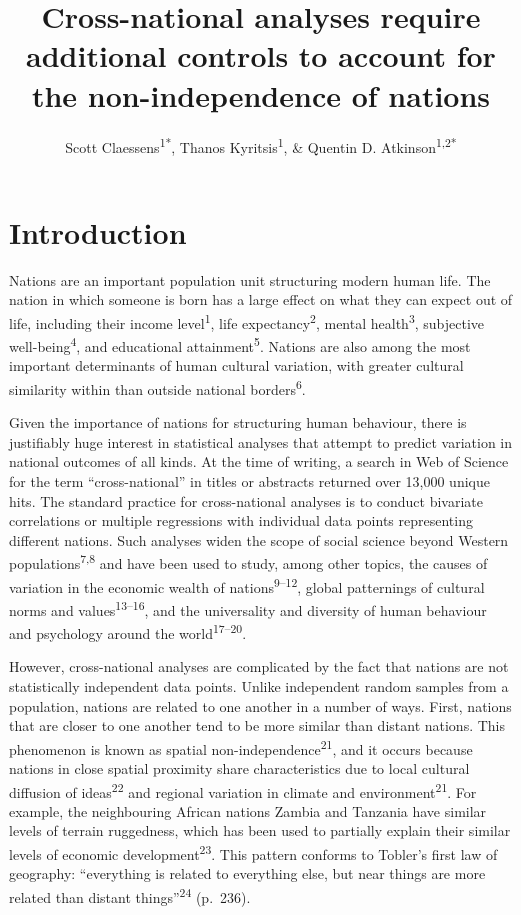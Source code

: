 \documentclass[
  man,floatsintext]{apa6}
\title{Cross-national analyses require additional controls to account for the non-independence of nations}
\author{Scott Claessens\textsuperscript{1*}, Thanos Kyritsis\textsuperscript{1}, \& Quentin D. Atkinson\textsuperscript{1,2*}}
\date{}
\affiliation{\vspace{0.5cm}\textsuperscript{1} \footnotesize School of Psychology, University of Auckland, Auckland, New Zealand\\\textsuperscript{2} \footnotesize School of Anthropology and Museum Ethnography, University of Oxford, Oxford, United Kingdom \newline *email: \href{mailto:scott.claessens@gmail.com}{\nolinkurl{scott.claessens@gmail.com}}; \href{mailto:q.atkinson@auckland.ac.nz}{\nolinkurl{q.atkinson@auckland.ac.nz}}}
\begin{document}
\maketitle

\linenumbers

\hypertarget{introduction}{%
\section{Introduction}\label{introduction}}

Nations are an important population unit structuring modern human life. The nation in which someone is born has a large effect on what they can expect out of life, including their income level\textsuperscript{1}, life expectancy\textsuperscript{2}, mental health\textsuperscript{3}, subjective well-being\textsuperscript{4}, and educational attainment\textsuperscript{5}. Nations are also among the most important determinants of human cultural variation, with greater cultural similarity within than outside national borders\textsuperscript{6}.

Given the importance of nations for structuring human behaviour, there is justifiably huge interest in statistical analyses that attempt to predict variation in national outcomes of all kinds. At the time of writing, a search in Web of Science for the term ``cross-national'' in titles or abstracts returned over 13,000 unique hits. The standard practice for cross-national analyses is to conduct bivariate correlations or multiple regressions with individual data points representing different nations. Such analyses widen the scope of social science beyond Western populations\textsuperscript{7,8} and have been used to study, among other topics, the causes of variation in the economic wealth of nations\textsuperscript{9--12}, global patternings of cultural norms and values\textsuperscript{13--16}, and the universality and diversity of human behaviour and psychology around the world\textsuperscript{17--20}.

However, cross-national analyses are complicated by the fact that nations are not statistically independent data points. Unlike independent random samples from a population, nations are related to one another in a number of ways. First, nations that are closer to one another tend to be more similar than distant nations. This phenomenon is known as spatial non-independence\textsuperscript{21}, and it occurs because nations in close spatial proximity share characteristics due to local cultural diffusion of ideas\textsuperscript{22} and regional variation in climate and environment\textsuperscript{21}. For example, the neighbouring African nations Zambia and Tanzania have similar levels of terrain ruggedness, which has been used to partially explain their similar levels of economic development\textsuperscript{23}. This pattern conforms to Tobler's first law of geography: ``everything is related to everything else, but near things are more related than distant things''\textsuperscript{24} (p.~236).
\end{document}
